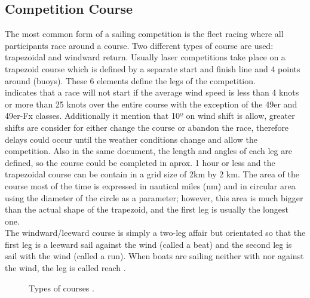 \subsection{Competition Course}\label{tracks}
The most common form of a sailing competition is the fleet racing where all participants race around a course. Two different types of course are used: trapezoidal and windward return. Usually laser competitions take place on a trapezoid course which is defined by a separate start and finish line and 4 points around (buoys). These 6 elements define the legs of the competition. \\ \cite{race_pol} indicates that a race will not start if the average wind speed is less than 4 knots or more than 25 knots over the entire course  with the exception of the 49er and 49er-Fx classes. Additionally it mention that 10º on wind shift is allow, greater shifts are consider for either change the course or abandon the race, therefore delays could occur until the weather conditions change and allow the competition.  Also in the same document, the length and angles of each leg are  defined, so the course could be completed in aprox. 1 hour  or less and the trapezoidal course can be contain in a grid size of 2km by 2 km.  The area of the course most of the time is expressed in nautical miles (nm) and in circular area using the diameter of the circle as a parameter; however, this area is much bigger than the actual shape of the trapezoid, and the first leg is usually the longest one.   %
\\ The windward/leeward course is simply a two-leg affair but orientated so that the first leg is a leeward sail against the wind (called a beat) and the second leg is sail with the wind (called a run). When boats are sailing neither with nor against the wind, the leg is called reach \cite{race_pol}.

\begin{figure}[ht]
  \centering
  \hfill
  \caption{Types of courses \cite{instr_rio}.}
\label{typecourses} 
\end{figure}

